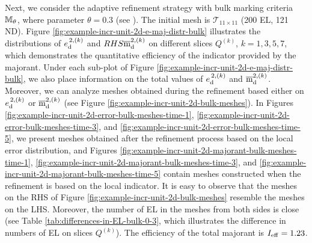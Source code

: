 \begin{example}
Next, we consider the adaptive refinement strategy with bulk marking criteria 
${\mathbb M}_{\theta}$, where parameter $\theta = 0.3$ (see \cite{Dorfler1996}). 
The initial mesh is  
$\mathcal{T}_{11 \times 11}$ (200 EL, 121 ND).
Figure \ref{fig:example-incr-unit-2d-e-maj-distr-bulk}
illustrates the distributions of ${e}^{\,2, ({k})}_{\mathrm{d}}$ and $RHS
\overline{\mathrm m}^{2, ({k})}_{\mathrm{d}}$ on different slices
$Q^{(k)}$, $k = 1, 3, 5, 7$, which demonstrates 
the quantitative efficiency of the indicator
provided by the majorant. Under each sub-plot of Figure \ref{fig:example-incr-unit-2d-e-maj-distr-bulk}, we also place information on the total values of ${e}^{\,2, ({k})}_{\mathrm{d}}$ and 
$\overline{\mathrm m}^{2, ({k})}_{\mathrm{d}}$.
%
Moreover, we can analyze 
meshes obtained during the refinement based either on ${e}^{\,2, ({k})}_{\mathrm{d}}$ or $\overline{\mathrm m}^{2, ({k})}_{\mathrm{d}}$ 
(see Figure \ref{fig:example-incr-unit-2d-bulk-meshes}). 
In Figures \ref{fig:example-incr-unit-2d-error-bulk-meshes-time-1}, 
\ref{fig:example-incr-unit-2d-error-bulk-meshes-time-3}, and 
\ref{fig:example-incr-unit-2d-error-bulk-meshes-time-5}, we present meshes obtained 
after the refinement process based on the local error distribution, and Figures
\ref{fig:example-incr-unit-2d-majorant-bulk-meshes-time-1}, 
\ref{fig:example-incr-unit-2d-majorant-bulk-meshes-time-3}, and 
\ref{fig:example-incr-unit-2d-majorant-bulk-meshes-time-5} contain meshes constructed 
when the refinement is based on the local indicator. It is easy to observe that the meshes 
on the RHS of Figure \ref{fig:example-incr-unit-2d-bulk-meshes} resemble the meshes on the LHS. 
Moreover, the number of EL in the meshes from both sides is close (see Table 
\ref{tab:differences-in-EL-bulk-0-3}, which illustrates the difference
in numbers of EL on slices $Q^{(k)}$). 
The efficiency of the total majorant is $I_{\rm eff} =  1.23$.


\end{example}
